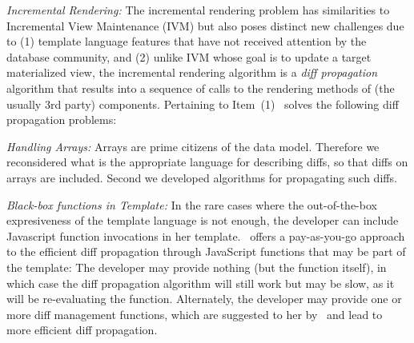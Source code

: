\begin{compact_item}
%
\item \textit{Incremental Rendering:} The incremental rendering problem has similarities to Incremental View Maintenance (IVM) but also poses distinct new challenges due to (1) template language features that have not received attention by the database community, and (2) unlike IVM whose goal is to update a target materialized view, the incremental rendering algorithm is a \textit{diff propagation} algorithm that results into a sequence of calls to the rendering methods of (the usually 3rd party) components.  Pertaining to Item~(1) \projname\ solves the following diff propagation problems:
\begin{compact_enum}
\item \textit{Handling Arrays:} Arrays are prime citizens of the data model. Therefore we reconsidered what is the appropriate language for describing diffs, so that diffs on arrays are included. Second we developed algorithms for propagating such diffs.   
%


\item \textit{Black-box functions in Template:} In the rare cases where the out-of-the-box expresiveness of the template language is not enough, the developer can include Javascript function invocations in her template. \projname\ offers a pay-as-you-go approach to the efficient diff propagation through JavaScript functions that may be part of the template: The developer may provide nothing (but the function itself), in which case the diff propagation algorithm will still work but may be slow, as it will be re-evaluating the function. Alternately, the developer may provide one or more diff management functions, which are suggested to her by \projname\ and lead to more efficient diff propagation.  
%


\end{compact_enum}
\end{compact_item}
